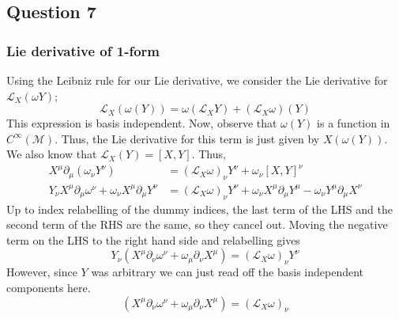 \subsection{Question 7} 

\subsubsection*{Lie derivative of 1-form} 
Using the Leibniz rule for our Lie derivative, we consider the Lie derivative 
for $ \mathcal{ L }_X ( \omega Y ) $; 
\[
\mathcal{ L }_X ( \omega( Y) ) = \omega ( \mathcal{ L }_X Y ) + ( \mathcal{ L }_ X \omega) ( Y) 	
\] This expression is basis independent. 
Now, observe that $ \omega ( Y ) $ is a function in  $ C^ \infty ( \mathcal{ M }) $. 
Thus, the Lie derivative for this term is just given by $ X ( \omega ( Y) )  $. 
We also know that $ \mathcal{  L }_X ( Y )  = [ X, Y ] $. 
Thus, 
\begin{align*}
X^\mu\partial _\mu ( \omega_\nu Y ^\nu) & = (\mathcal{L }_X \omega)_\nu Y ^\nu + \omega_\nu [ X, Y ] ^\nu  \\
Y_\nu X^\mu \partial _\mu \omega^\nu + \omega_\nu X^\mu \partial _\mu Y^\nu  &= ( \mathcal{ L }_ X \omega)_\nu Y ^\nu + \omega_\nu X^\mu \partial_\mu Y^\mu  - \omega_\nu Y^\mu \partial _\mu X^\nu
\end{align*} Up to index relabelling of the dummy indices, the last term of the LHS 
and the second term of the RHS are the same, so they cancel out. 
Moving the negative term on the LHS to the right hand side and relabelling gives 
\[
Y_\nu ( X^\mu \partial_\nu \omega^\nu + \omega_\mu \partial_\nu X^\mu ) = ( \mathcal{ L }_X \omega) _\nu Y ^\nu
\] However, since $ Y $ was arbitrary we can just read off the 
basis independent components here. 
\[
( X^\mu \partial_\nu \omega^\nu + \omega_\mu \partial_\nu X^\mu ) = ( \mathcal{ L }_X \omega) _\nu 
\]
